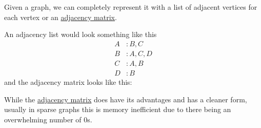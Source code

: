   \begin{example}
    \label{ex:adjacency-list-vs-matrix}
    Given a graph, we can completely represent it with a list of adjacent vertices for each vertex or an \hyperref[def:adjacency-matrix]{adjacency matrix}. 
    \begin{center}
    \end{center}
    An adjacency list would look something like this 
    \begin{equation}
      \begin{aligned}
      A &: B, C \\
      B &: A, C, D \\
      C &: A, B \\
      D &: B
      \end{aligned}
    \end{equation}
    and the adjacency matrix looks like this: 
    \begin{center}
    \end{center}
  \end{example}

  While the \hyperref[def:adjacency-matrix]{adjacency matrix} does have its advantages and has a cleaner form, usually in sparse graphs this is memory inefficient due to there being an overwhelming number of $0$s. 

  \begin{algo}
    
  \end{algo}

